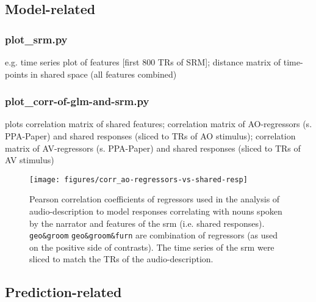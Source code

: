 \subsection{Model-related}

\subsubsection{plot\_srm.py}


e.g. time series plot of features [first 800 TRs of SRM]; distance matrix of
time-points in shared space (all features combined)


\subsubsection{plot\_corr-of-glm-and-srm.py}


plots correlation matrix of shared features; correlation matrix of
AO-regressors (s. PPA-Paper) and shared responses (sliced to TRs of AO
stimulus); correlation matrix of AV-regressors (s. PPA-Paper) and shared
responses (sliced to TRs of AV stimulus)




\begin{figure*}[tbp]
\centering
    \texttt{[image: figures/corr\_ao-regressors-vs-shared-resp]}
    \caption{Pearson correlation coefficients of regressors used in the analysis
    of audio-description to model responses correlating with nouns spoken by the
    narrator and features of the \ac{srm} (i.e. shared responses).
    \texttt{geo\&groom} \texttt{geo\&groom\&furn} are combination of regressors
    (as used on the positive side of contrasts). The
    time series of the \ac{srm} were sliced to match the TRs of the
    audio-description.
      }
\label{fig:reg-corr}
\end{figure*}


\subsection{Prediction-related}

